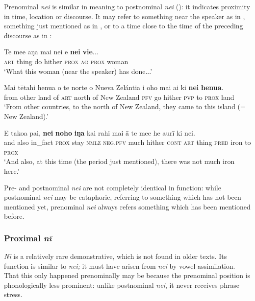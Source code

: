 Prenominal \textit{nei} is similar in meaning to postnominal \textit{nei} (): it indicates proximity in time, location or discourse. It may refer to something near the speaker as in , something just mentioned as in , or to a time close to the time of the preceding discourse as in :

\ea\label{ex:4.219}
\gll Te me{\ꞌ}e aŋa mai nei e \textbf{nei} \textbf{vi{\ꞌ}e}... \\
\textsc{art} thing do hither \textsc{prox} \textsc{ag} \textsc{prox} woman \\

\glt 
‘What this woman (near the speaker) has done...’ \textstyleExampleref{[Mat. 26:12]}
\z

\ea\label{ex:4.220}
\gll Mai tētahi henua o te norte o Nueva Zelántia i oho mai ai  ki \textbf{nei} \textbf{henua}.\\
from other land of \textsc{art} north of New Zealand \textsc{pfv} go hither \textsc{pvp}  to \textsc{prox} land\\

\glt 
‘From other countries, to the north of New Zealand, they came to this island (= New Zealand).’ \textstyleExampleref{[R346.012]} 
\z

\ea\label{ex:4.221}
\gll {\ꞌ}E tako{\ꞌ}a pa{\ꞌ}i, \textbf{nei} \textbf{noho} \textbf{iŋa} kai rahi mai {\ꞌ}ā te me{\ꞌ}e  he {\ꞌ}aurī ki nei.\\
and also in\_fact \textsc{prox} stay \textsc{nmlz} \textsc{neg.pfv} much hither \textsc{cont} \textsc{art} thing  \textsc{pred} iron to \textsc{prox}\\

\glt
‘And also, at this time (the period just mentioned), there was not much iron here.’ \textstyleExampleref{[R353.006]} 
\z

Pre- and postnominal \textit{nei} are not completely identical in function: while postnominal \textit{nei} may be cataphoric, referring to something which has not been mentioned yet, prenominal \textit{nei} always refers something which has been mentioned before.
\subsubsection[Proximal nī]{Proximal \textit{nī}}\label{sec:4.6.4.3}

\textit{Nī} is a relatively rare demonstrative, which is not found in older texts. Its function is similar to \textit{nei;} it must have arisen from \textit{nei} by vowel assimilation. That this only happened prenominally may be because the prenominal position is phonologically less prominent: unlike postnominal \textit{nei}, it never receives phrase stress.


